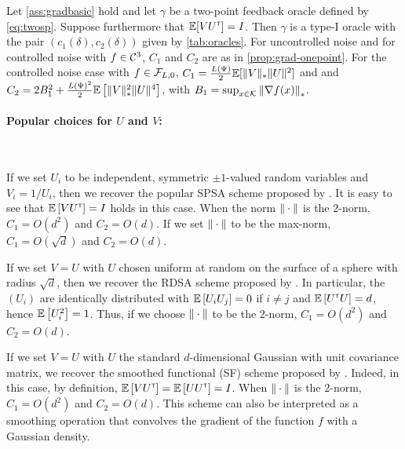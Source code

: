 \begin{proposition}
\label{prop:grad-spsa}
Let \cref{ass:gradbasic} hold and let $\gamma$  be a two-point feedback oracle defined by \eqref{eq:twosp}.
Suppose furthermore that $\mathbb{E}[V U^\mathsf{\scriptscriptstyle T}] = I$.
Then $\gamma$ is a type-I oracle with the pair $(c_1(\delta),c_2(\delta))$ 
given by \cref{tab:oracles}. For uncontrolled noise and for controlled noise with $f\in\mathcal{C}^3$, $C_1$ and $C_2$ are as in \cref{prop:grad-onepoint}. For the controlled noise case with $f \in \mathcal{F}_{L,0}$,
$C_1 = \frac{L(\Psi)}{2} \mathbb{E}[ \|V\|_* \|U\|^2]$ and 
and
$C_2 =  2 B_1^2  + \frac{ L(\Psi)^2}{2}\mathbb{E}\left[ \|V\|_*^2 \|U\|^4 \right]$, with $B_1 = \sup_{x\in \mathcal{K}} \left\|\nabla f(x)\right\|_*$.
\end{proposition}

\paragraph{Popular choices for $U$ and $V$:}\ \\
\begin{inparaenum}[$\bullet$]
 \item If we set $U_i$ to be independent, symmetric $\pm 1$-valued random variables and $V_i = 1/U_i$, then we recover the popular SPSA scheme proposed by \cite{spall1992multivariate}.
It is easy to see that $\mathbb{E}\left[  V U^\mathsf{\scriptscriptstyle T} \right] = I$ holds in this case.
 When the norm $\|\cdot\|$ is the $2$-norm, $C_1 = O(d^2)$ and $C_2 = O(d)$. If we set $\|\cdot\|$ to be the max-norm, $C_1 = O(\sqrt{d})$ and $C_2 = O(d)$.\\
 \item If we set $V=U$ with $U$ chosen uniform at random on the surface of a sphere with radius $\sqrt{d}$,
 then we recover the RDSA scheme proposed by  \citet[pp.~58--60]{kushcla}.
 In particular, the $(U_i)$ are identically distributed with $\mathbb{E}\left[ U_i U_j \right] = 0$ if $i\ne j$ and $\mathbb{E}\left[ U^\mathsf{\scriptscriptstyle T} U \right] = d$, hence $\mathbb{E}\left[U_i^2\right] = 1$. Thus, if we choose $\|\cdot\|$ to be the $2$-norm, $C_1 = O( d^2 )$ and $C_2 = O(d)$.\\
 \item If we set $V=U$ with $U$ the standard $d$-dimensional Gaussian with unit covariance matrix, we recover the smoothed functional (SF) scheme proposed by \cite{katkul}.
Indeed, in this case, by definition, $\mathbb{E}\left[VU^\mathsf{\scriptscriptstyle T}\right] = \mathbb{E}\left[U U^\mathsf{\scriptscriptstyle T} \right] = I$.
When $\|\cdot\|$ is the $2$-norm, $C_1 = O(d^2)$
 and $C_2 = O( d)$.
 This scheme can also be interpreted as a smoothing operation that  convolves the gradient of the function $f$ with a Gaussian density.
\end{inparaenum}


